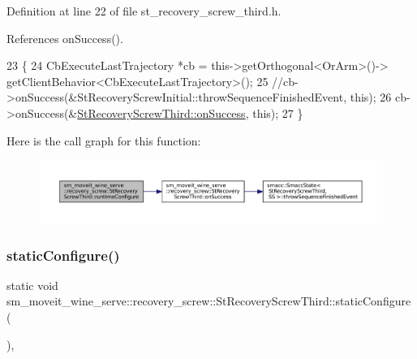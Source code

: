 Definition at line 22 of file st\+\_\+recovery\+\_\+screw\+\_\+third.\+h.



References on\+Success().


\begin{DoxyCode}
23             \{
24                 CbExecuteLastTrajectory *cb = this->getOrthogonal<OrArm>()->
      getClientBehavior<CbExecuteLastTrajectory>();
25                 \textcolor{comment}{//cb->onSuccess(&StRecoveryScrewInitial::throwSequenceFinishedEvent, this);}
26                 cb->onSuccess(&\hyperlink{structsm__moveit__wine__serve_1_1recovery__screw_1_1StRecoveryScrewThird_a2bbe0e017dd3c7441be93c1911e46614}{StRecoveryScrewThird::onSuccess}, \textcolor{keyword}{this});
27             \}
\end{DoxyCode}
Here is the call graph for this function\+:
\nopagebreak
\begin{figure}[H]
\begin{center}
\leavevmode
\includegraphics[width=350pt]{structsm__moveit__wine__serve_1_1recovery__screw_1_1StRecoveryScrewThird_a4be2a6422f6583624108f81cbcf95206_cgraph}
\end{center}
\end{figure}
\mbox{\label{structsm__moveit__wine__serve_1_1recovery__screw_1_1StRecoveryScrewThird_a1420d857701ac34eec84b4e5870c833e}} 
\subsubsection{\texorpdfstring{static\+Configure()}{staticConfigure()}}
{\footnotesize\ttfamily static void sm\+\_\+moveit\+\_\+wine\+\_\+serve\+::recovery\+\_\+screw\+::\+St\+Recovery\+Screw\+Third\+::static\+Configure (\begin{DoxyParamCaption}{ }\end{DoxyParamCaption})\hspace{0.3cm}{\ttfamily [inline]}, {\ttfamily [static]}}



